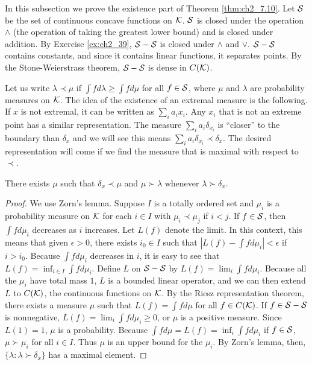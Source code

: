 
In this subsection we prove the existence part of Theorem \ref{thm:ch2_7.10}. Let $\mathcal{S}$ be the set of continuous concave functions on $\mathcal{K}$. $\mathcal{S}$ is closed under the operation $\wedge$ (the operation of taking the greatest lower bound) and is closed under addition. By Exercise \ref{ex:ch2_39}, $\mathcal{S} - \mathcal{S}$ is closed under $\wedge$ and $\vee$. $\mathcal{S} - \mathcal{S}$ contains constants, and since it contains linear functions, it separates points. By the Stone-Weierstrass theorem, $\mathcal{S} - \mathcal{S}$ is dense in $C(\mathcal{K})$.

Let us write $\lambda\prec \mu$ if $\int fd\lambda \ge \int fd\mu$ for all $f\in \mathcal{S}$, where $\mu$ and $\lambda$ are probability measures on $\mathcal{K}$. The idea of the existence of an extremal measure is the following. If $x$ is not extremal, it can be written as $\sum_i a_ix_i$. Any $x_i$ that is not an extreme point has a similar representation. The measure $\sum_i a_i\delta_{x_i}$ is ``closer'' to the boundary than $\delta_x$ and we will see this means $\sum_i a_i\delta_{x_i}\prec \delta_x$. The desired representation will come if we find the measure that is maximal with respect to $\prec$.


\begin{proposition}\label{prop:ch2_7.12}
There exists $\mu$ such that $\delta_x\prec\mu$ and $\mu\succ\lambda$ whenever $\lambda\succ\delta_x$.
\end{proposition}

\begin{proof}
We use Zorn's lemma. Suppose $I$ is a totally ordered set and $\mu_i$ is a probability measure on $\mathcal{K}$ for each $i \in I$ with $\mu_i\prec\mu_j$ if $i < j$. If $f \in \mathcal{S}$, then $\int f d\mu_i$ decreases as $i$ increases. Let $L(f)$ denote the limit. In this context, this means that given $\epsilon > 0$, there exists $i_0 \in I$ such that $|L(f) - \int f d\mu_i| < \epsilon$ if $i > i_0$. Because $\int f d\mu_i$ decreases in $i$, it is easy to see that $L(f) = \inf_{i\in I} \int f d\mu_i$. Define $L$ on $\mathcal{S} - \mathcal{S}$ by $L(f) = \lim_i \int f d\mu_i$. Because all the $\mu_i$ have total mass $1$, $L$ is a bounded linear operator, and we can then extend $L$ to $C(\mathcal{K})$, the continuous functions on $\mathcal{K}$. By the Riesz representation theorem, there exists a measure $\mu$ such that $L(f) = \int f d\mu$ for all $f \in C(\mathcal{K})$. If $f \in \mathcal{S} - \mathcal{S}$ is nonnegative, $L(f) = \lim_i \int f d\mu_i \geq 0$, or $\mu$ is a positive measure. Since $L(1) = 1$, $\mu$ is a probability. Because $\int f d\mu = L(f) = \inf_i \int f d\mu_i$ if $f \in \mathcal{S}$, $\mu\succ\mu_i$ for all $i \in I$. Thus $\mu$ is an upper bound for the $\mu_i$. By Zorn's lemma, then, $\{\lambda : \lambda\succ\delta_x\}$ has a maximal element.
\end{proof}

